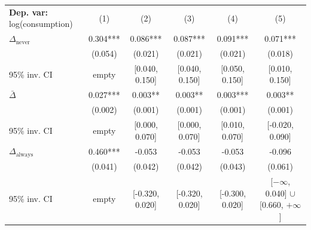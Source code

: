 \begin{tabular}{l ccccc} \toprule  \textbf{Dep. var:}  log(consumption) 
                    &\multicolumn{1}{c}{(1)}   &\multicolumn{1}{c}{(2)}   &\multicolumn{1}{c}{(3)}   &\multicolumn{1}{c}{(4)}   &\multicolumn{1}{c}{(5)}   \\

\addlinespace
$\Delta_{\text{never}}$&       0.304***&       0.086***&       0.087***&       0.091***&       0.071***\\
                    &     (0.054)   &     (0.021)   &     (0.021)   &     (0.021)   &     (0.018)   \\
95\% inv. CI        &       empty   &[0.040, 0.150]   &[0.040, 0.150]   &[0.050, 0.150]   &[0.010, 0.150]   \\

\addlinespace
$\bar{\Delta}$      &       0.027***&       0.003** &       0.003** &       0.003***&       0.003** \\
                    &     (0.002)   &     (0.001)   &     (0.001)   &     (0.001)   &     (0.001)   \\
95\% inv. CI        &       empty   &[0.000, 0.070]   &[0.000, 0.070]   &[0.010, 0.070]   &[-0.020, 0.090]   \\

\addlinespace
$\Delta_{\text{always}}$&       0.460***&      -0.053   &      -0.053   &      -0.053   &      -0.096   \\
                    &     (0.041)   &     (0.042)   &     (0.042)   &     (0.043)   &     (0.061)   \\
95\% inv. CI        &       empty   &[-0.320, 0.020]   &[-0.320, 0.020]   &[-0.300, 0.020]   &[$-\infty$, 0.040] $\cup$ [0.660, $+\infty$]   \\


\end{tabular}
